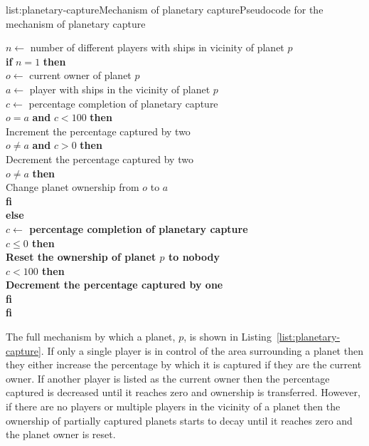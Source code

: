 \vspace{-0.5em}
\begin{listing}{list:planetary-capture}{Mechanism of planetary capture}{Pseudocode for the mechanism of planetary capture}{}
\end{listing}\vspace{-1.5em}

\begin{tabbing}
$n \leftarrow$ number of different players with ships in vicinity of planet $p$ \\
{\bf if} $n = 1$ {\bf then} \\
\quad $o \leftarrow$ current owner of planet $p$ \\
\quad $a \leftarrow$ player with ships in the vicinity of planet $p$ \\
\quad $c \leftarrow$ percentage completion of planetary capture \\
 $o = a$ {\bf and} $c < 100$ {\bf then} \\
\quad\quad Increment the percentage captured by two \\
 $o \neq a$ {\bf and} $c > 0$ {\bf then} \\
\quad\quad Decrement the percentage captured by two \\
 $o \neq a$ {\bf then} \\
\quad\quad Change planet ownership from $o$ to $a$ \\
\quad\bf fi \\
\bf else \\
\quad $c \leftarrow$ percentage completion of planetary capture \\
 $c \leq 0$ {\bf then} \\
\quad\quad Reset the ownership of planet $p$ to nobody \\
 $c < 100$ {\bf then} \\
\quad\quad Decrement the percentage captured by one \\
\quad\bf fi \\
\bf fi
\end{tabbing}
\noindent
The full mechanism by which a planet, $p$, is shown in Listing~\ref{list:planetary-capture}.
If only a single player is in control of the area surrounding a planet then they either
increase the percentage by which it is captured if they are the current owner. If another
player is listed as the current owner then the percentage captured is decreased until it
reaches zero and ownership is transferred. However, if there are no players or multiple
players in the vicinity of a planet then the ownership of partially captured planets
starts to decay until it reaches zero and the planet owner is reset.
